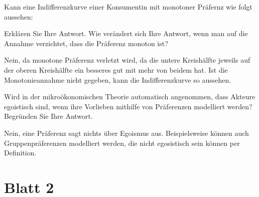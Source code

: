 \begin{question}
	Kann eine Indifferenzkurve einer Konsumentin mit monotoner Präfernz wie folgt aussehen:

	\begin{center}
	\end{center}
	Erklären Sie Ihre Antwort. Wie verändert sich Ihre Antwort, wenn man auf die Annahme verzichtet,
	dass die Präferenz monoton ist?
\end{question}

\begin{solution}
	Nein, da monotone Präferenz verletzt wird, da die untere Kreishälfte jeweils auf der oberen Kreishälfte ein besseres gut mit mehr von beidem hat. Ist die Monotonieannahme nicht gegeben, kann die Indifferenzkurve so aussehen.
\end{solution}

\begin{question}
	Wird in der mikroökonomischen Theorie automatisch angenommen, dass Akteure egoistisch sind, wenn
	ihre Vorlieben mithilfe von Präferenzen modelliert werden? Begründen Sie Ihre Antwort.
\end{question}
\begin{solution}
	Nein, eine Präferenz sagt nichts über Egoismus aus. Beispielsweise können auch Gruppenpräferenzen modelliert werden, die nicht egosistisch sein können per Definition.
\end{solution}


\section{Blatt 2}

